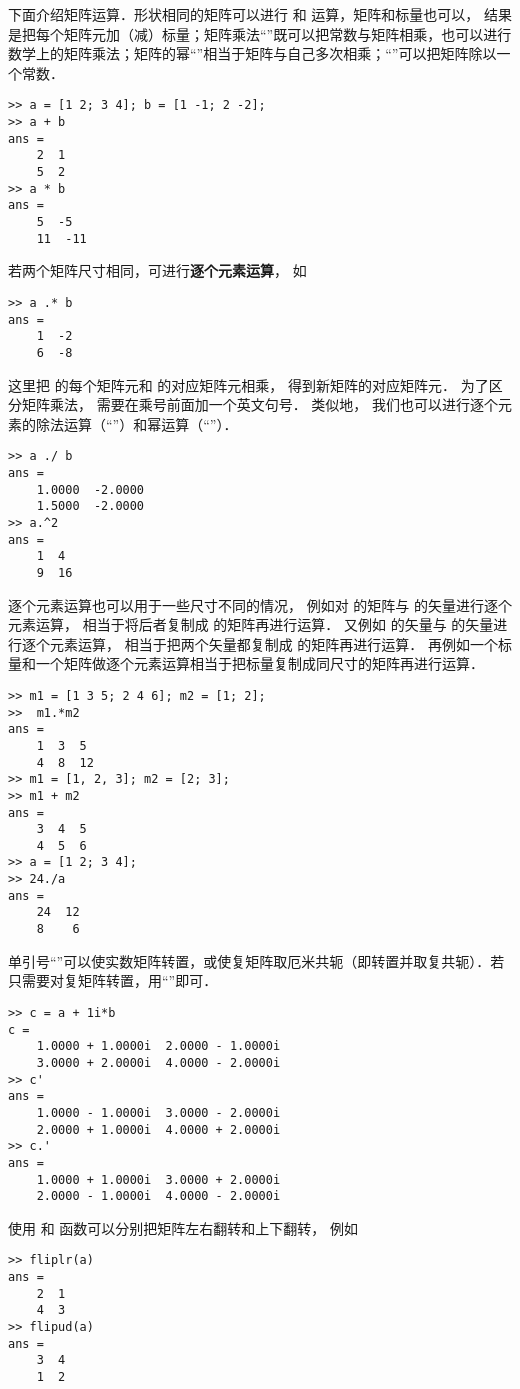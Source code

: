下面介绍矩阵运算．形状相同的矩阵可以进行 \x{+} 和 \x{-} 运算，矩阵和标量也可以， 结果是把每个矩阵元加（减）标量；矩阵乘法“\x{*}”既可以把常数与矩阵相乘，也可以进行数学上的矩阵乘法；矩阵的幂“\x{\^{}}”相当于矩阵与自己多次相乘；“\x{/}”可以把矩阵除以一个常数．
\begin{lstlisting}[language=MatlabCom]
>> a = [1 2; 3 4]; b = [1 -1; 2 -2];
>> a + b
ans =
    2  1
    5  2
>> a * b
ans =
    5  -5
    11  -11
\end{lstlisting}
若两个矩阵尺寸相同，可进行\textbf{逐个元素运算}， 如
\begin{lstlisting}[language=MatlabCom]
>> a .* b
ans =
    1  -2
    6  -8
\end{lstlisting}
这里把  的每个矩阵元和  的对应矩阵元相乘， 得到新矩阵的对应矩阵元． 为了区分矩阵乘法， 需要在乘号前面加一个英文句号． 类似地， 我们也可以进行逐个元素的除法运算（“”）和幂运算（“”）．
\begin{lstlisting}[language=MatlabCom]
>> a ./ b
ans =
    1.0000  -2.0000
    1.5000  -2.0000
>> a.^2
ans =
    1  4
    9  16
\end{lstlisting}

逐个元素运算也可以用于一些尺寸不同的情况， 例如对  的矩阵与  的矢量进行逐个元素运算， 相当于将后者复制成  的矩阵再进行运算． 又例如  的矢量与  的矢量进行逐个元素运算， 相当于把两个矢量都复制成  的矩阵再进行运算． 再例如一个标量和一个矩阵做逐个元素运算相当于把标量复制成同尺寸的矩阵再进行运算．

\begin{lstlisting}[language=MatlabCom]
>> m1 = [1 3 5; 2 4 6]; m2 = [1; 2];
>>  m1.*m2
ans =
    1  3  5
    4  8  12
>> m1 = [1, 2, 3]; m2 = [2; 3];
>> m1 + m2
ans =
    3  4  5
    4  5  6
>> a = [1 2; 3 4];
>> 24./a
ans =
    24  12
    8    6
\end{lstlisting}

单引号“”可以使实数矩阵转置，或使复矩阵取厄米共轭（即转置并取复共轭）．若只需要对复矩阵转置，用“”即可．
\begin{lstlisting}[language=MatlabCom]
>> c = a + 1i*b
c =
    1.0000 + 1.0000i  2.0000 - 1.0000i
    3.0000 + 2.0000i  4.0000 - 2.0000i
>> c'
ans =
    1.0000 - 1.0000i  3.0000 - 2.0000i
    2.0000 + 1.0000i  4.0000 + 2.0000i
>> c.'
ans =
    1.0000 + 1.0000i  3.0000 + 2.0000i
    2.0000 - 1.0000i  4.0000 - 2.0000i
\end{lstlisting}
使用  和  函数可以分别把矩阵左右翻转和上下翻转， 例如
\begin{lstlisting}[language=MatlabCom]
>> fliplr(a)
ans =
    2  1
    4  3
>> flipud(a)
ans =
    3  4
    1  2
\end{lstlisting}

